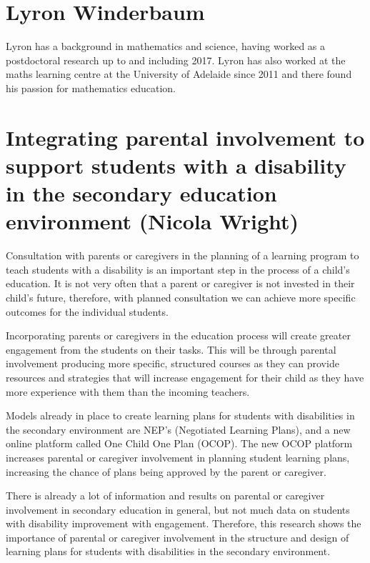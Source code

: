 \documentclass[twoside,14pt,a4paper,notitlepage]{memoir}
\begin{document}
\section*{Lyron Winderbaum}

Lyron has a background in mathematics and science, having worked as a postdoctoral research up to and including 2017. Lyron has also worked at the maths learning centre at the University of Adelaide since 2011 and there found his passion for mathematics education.


\section*{Integrating parental involvement to support students with a disability in the secondary education environment (Nicola Wright)}
\label{aut:wright}

Consultation with parents or caregivers in the planning of a learning program to teach students with a disability is an important step in the process of a child’s education. It is not very often that a parent or caregiver is not invested in their child’s future, therefore, with planned consultation we can achieve more specific outcomes for the individual students.

Incorporating parents or caregivers in the education process will create greater engagement from the students on their tasks. This will be through parental involvement producing more specific, structured courses as they can provide resources and strategies that will increase engagement for their child as they have more experience with them than the incoming teachers.

Models already in place to create learning plans for students with disabilities in the secondary environment are NEP’s (Negotiated Learning Plans), and a new online platform called One Child One Plan (OCOP). The new OCOP platform increases parental or caregiver involvement in planning student learning plans, increasing the chance of plans being approved by the parent or caregiver.

There is already a lot of information and results on parental or caregiver involvement in secondary education in general, but not much data on students with disability improvement with engagement. Therefore, this research shows the importance of parental or caregiver involvement in the structure and design of learning plans for students with disabilities in the secondary environment.
\end{document}
